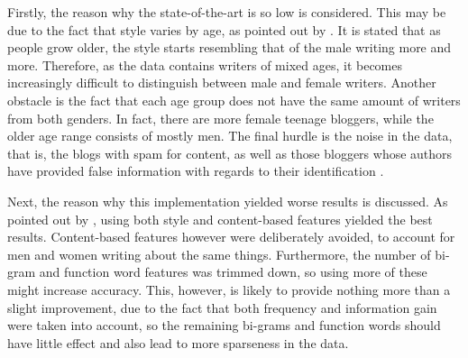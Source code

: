 Firstly, the reason why the state-of-the-art is so low is considered. This may be due to the fact that style varies by age, as pointed out by \cite{2}. It is stated that  as people grow older, the style starts resembling that of the male writing more and more. Therefore, as the data contains writers of mixed ages, it becomes increasingly difficult to distinguish between male and female writers. Another obstacle is the fact that each age group does not have the same amount of writers from both genders. In fact, there are more female teenage bloggers, while the older age range consists of mostly men. The final hurdle is the noise in the data, that is, the blogs with spam for content, as well as those bloggers whose authors have provided false information with regards to their identification \cite{2}.

Next, the reason why this implementation yielded worse results is discussed. As pointed out by \cite{2}, using both style and content-based features yielded the best results. Content-based features however were deliberately avoided, to account for men and women writing about the same things. Furthermore, the number of bi-gram and function word features was trimmed down, so using more of these might increase accuracy. This, however, is likely to provide nothing more than a slight improvement, due to the fact that both frequency and information gain were taken into account, so the remaining bi-grams and function words should have little effect and also lead to more sparseness in the data. 